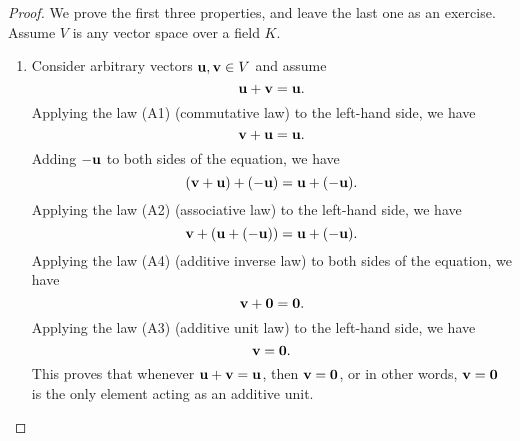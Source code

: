 \begin{proof}
  We prove the first three properties, and leave the last one as an
  exercise. Assume $V$ is any vector space over a field $K$.
  \begin{enumialphparenastyle}
    \begin{enumerate}
    \item Consider arbitrary vectors $\vect{u},\vect{v}\in V$ and assume
      \begin{equation*}
        \vect{u}+\vect{v}=\vect{u}.
      \end{equation*}
      Applying the law (A1) (commutative law) to the left-hand side, we have
      \begin{equation*}
        \vect{v}+\vect{u}=\vect{u}.
      \end{equation*}
      Adding $-\vect{u}$ to both sides of the equation, we have
      \begin{equation*}
        (\vect{v}+\vect{u})+(-\vect{u}) = \vect{u}+(-\vect{u}).
      \end{equation*}
      Applying the law (A2) (associative law) to the left-hand side, we
      have
      \begin{equation*}
        \vect{v}+(\vect{u}+(-\vect{u})) = \vect{u}+(-\vect{u}).
      \end{equation*}
      Applying the law (A4) (additive inverse law) to both sides of the
      equation, we have
      \begin{equation*}
        \vect{v}+\vect{0} = \vect{0}.
      \end{equation*}
      Applying the law (A3) (additive unit law) to the left-hand side,
      we have
      \begin{equation*}
        \vect{v} = \vect{0}.
      \end{equation*}
      This proves that whenever $\vect{u}+\vect{v}=\vect{u}$, then
      $\vect{v} = \vect{0}$, or in other words, $\vect{v} = \vect{0}$ is
      the only element acting as an additive unit.
      

\end{enumerate}
\end{enumialphparenastyle}
\end{proof}
